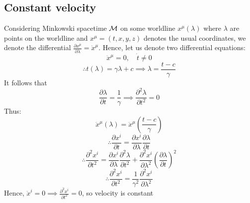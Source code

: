 \documentclass{article}
\begin{document}
 	\subsection{Constant velocity}
 	Considering Minkowski spacetime $\mathcal{M}$ on some worldline $x^\mu (\lambda)$ where $\lambda$ are points on the worldline and $x^\mu = (t,x,y,z)$ denotes the usual coordinates, we denote the differential $\frac{\partial x^\mu}{\partial \lambda} = \dot{x}^{\mu}$. Hence, let us denote two differential equations:
 	$$ \ddot{x}^{\mu} = 0, \quad \dot{t} \neq 0$$
 	$$ \therefore t(\lambda) = \gamma \lambda + c \implies \lambda = \frac{t-c}{\gamma}$$
 	It follows that
 	$$ \frac{\partial \lambda}{\partial t} = \frac{1}{\gamma} \implies \frac{\partial^2 \lambda}{\partial t^2} = 0 $$
 	Thus:
 	$$\ddot{x}^\mu (\lambda) = \ddot{x}^\mu \left( \frac{t-c}{\gamma} \right)$$
 	$$\therefore \frac{\partial x^{i}}{\partial t} = \frac{\partial x^{i}}{\partial \lambda} \frac{\partial \lambda}{\partial t} $$
 	$$\therefore \frac{\partial^2 x^{i}}{\partial t^2} = \frac{\partial x^{i}}{\partial \lambda} \frac{\partial^2 \lambda}{\partial t^2} + \frac{\partial^2 x^i}{\partial \lambda^2}\left(\frac{\partial \lambda}{\partial t}\right)^2 $$
 	$$ \therefore \frac{\partial^2 x^{i}}{\partial t^2} = \frac{1}{\gamma^2} \frac{\partial^2 x^{i}}{\partial \lambda^2}$$
 	Hence, $\ddot{x}^i = 0 \implies \frac{\partial^2 x^i}{\partial t^2} = 0$, so velocity is constant
 	
\end{document}
